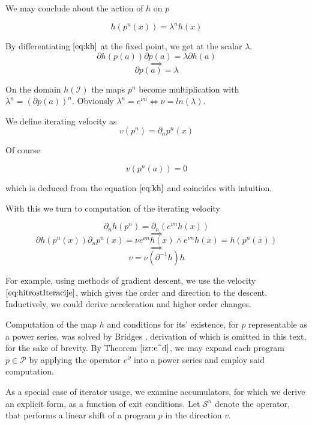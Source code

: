 \documentclass{article}
\newcommand{\Shift}{\mathcal{S}}
\newcommand{\dP}{\mathcal{P}}
\newcommand{\D}{\partial}
\begin{document}
  We may conclude about the action of $h$ on $p$
  
  \begin{equation}
  h(p^n(x))=\lambda^nh(x)
  \end{equation}
  
  By differentiating $\eqref{eq:kh}$ at the fixed point, we get at the scalar $\lambda$.
  $$\D h(p(a))\D p(a)=\lambda\D h(a)$$
  $$\implies$$
  $$\D p(a)=\lambda$$
  
  On the domain $h(\mathcal{I})$ the maps $p^n$ become multiplication with $\lambda^n=(\D p(a))^n$. Obviously $\lambda^n=e^{\nu n}\iff \nu=ln(\lambda)$.
  
  We define iterating velocity as
  \begin{equation}
  v(p^n)=\D_np^n(x)
  \end{equation}
  
  Of course
  
  \begin{equation}
  v(p^n(a))=0
  \end{equation}
  
  which is deduced from the equation $\eqref{eq:kh}$ and coincides with intuition.
  
  With this we turn to computation of the iterating velocity
 
  $$\D_nh(p^n)=\D_n(e^{\nu n}h(x))$$
  $$\implies$$
  $$\D h(p^n(x))\D_np^n(x)=\nu e^{\nu n}h(x) \land e^{\nu n}h(x)=h(p^n(x))$$
  $$\implies$$
  \begin{equation}\label{eq:hitrostIteracije}
  v=\nu(\D^{-1}h)h
  \end{equation}
  
  For example, using methods of gradient descent, we use the velocity $\eqref{eq:hitrostIteracije}$, which gives the order and direction to the descent. Inductively, we could derive acceleration and higher order changes.
  
  Computation of the map $h$ and conditions for its' existence, for $p$ representable as a power series, was solved by Bridges \cite{BridgesShroeder}, derivation of which is omitted in this text, for the sake of brevity. By Theorem $\ref{izr:e^d}$, we may expand each program $p\in\dP$ by applying the operator $e^\D$ into a power series and employ said computation.
  
  As a special case of iterator usage, we examine accumulators, for which we derive an explicit form, as a function of exit conditions. Let $\Shift^n$ denote the operator, that performs a linear shift of a program $p$ in the direction $v$.
   
\end{document}
